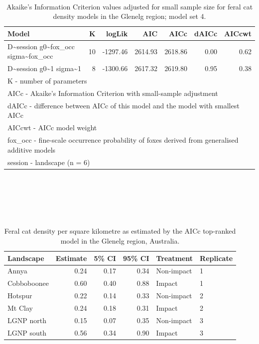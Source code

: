 \documentclass[11pt,a4paper,titlepage,twoside,openright]{style/unimelbthesis}
\begin{document}
\begin{mainmatter}
\(~\)

\(~\)

\(~\)

\begingroup\fontsize{10}{12}\selectfont
\begin{longtable}[t]{lrrrrrr}
\caption{\label{tab:density-aic-g-4}Akaike's Information Criterion values adjusted for small sample size for feral cat density models in the Glenelg region; model set 4.}\\
\toprule
Model & K & logLik & AIC & AICc & dAICc & AICcwt\\
\midrule
D\textasciitilde{}session g0\textasciitilde{}fox\_occ sigma\textasciitilde{}fox\_occ & 10 & -1297.46 & 2614.93 & 2618.86 & 0.00 & 0.62\\
D\textasciitilde{}session g0\textasciitilde{}1 sigma\textasciitilde{}1 & 8 & -1300.66 & 2617.32 & 2619.80 & 0.95 & 0.38\\
\bottomrule
\multicolumn{7}{l}{\rule{0pt}{1em}K - number of parameters}\\
\multicolumn{7}{l}{\rule{0pt}{1em}AICc - Akaike's Information Criterion with small-sample adjustment}\\
\multicolumn{7}{l}{\rule{0pt}{1em}dAICc - difference between AICc of this model and the model with smallest AICc}\\
\multicolumn{7}{l}{\rule{0pt}{1em}AICcwt - AICc model weight}\\
\multicolumn{7}{l}{\rule{0pt}{1em}fox\_occ - fine-scale occurrence probability of foxes derived from generalised additive models}\\
\multicolumn{7}{l}{\rule{0pt}{1em}session - landscape (n = 6)}\\
\end{longtable}
\endgroup{}

\newpage

\(~\)

\(~\)

\(~\)

\begingroup\fontsize{10}{12}\selectfont
\begin{longtable}[t]{lrrrll}
\caption{\label{tab:density-landscape-est}Feral cat density per square kilometre as estimated by the AICc top-ranked model in the Glenelg region, Australia.}\\
\toprule
Landscape & Estimate & 5\% CI & 95\% CI & Treatment & Replicate\\
\midrule
Annya & 0.24 & 0.17 & 0.34 & Non-impact & 1\\
Cobboboonee & 0.60 & 0.40 & 0.88 & Impact & 1\\
Hotspur & 0.22 & 0.14 & 0.33 & Non-impact & 2\\
Mt Clay & 0.24 & 0.18 & 0.31 & Impact & 2\\
LGNP north & 0.15 & 0.07 & 0.35 & Non-impact & 3\\
\addlinespace
LGNP south & 0.56 & 0.34 & 0.90 & Impact & 3\\
\bottomrule
\end{longtable}
\endgroup{}


\end{mainmatter}
\end{document}

